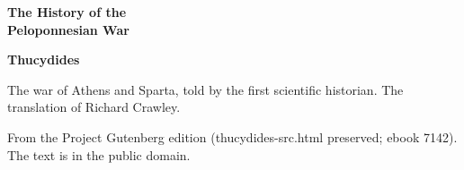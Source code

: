 \documentclass[11pt,letterpaper]{article}
\begin{document}
\color{ink}

\begin{titlepage}
\centering
\vspace*{4em}
{\LARGE\bfseries\color{heading} The History of the\\[0.3em]Peloponnesian War\par}
\vspace{2em}
{\Large\bfseries\color{heading} Thucydides\par}
\vspace{2.5em}
{\itshape\color{subhead}\parbox{0.8\linewidth}{\centering The war of Athens and Sparta, told by the first scientific historian. The translation of Richard Crawley.\par}}
\vfill
{\small From the Project Gutenberg edition (thucydides-src.html preserved; ebook 7142). The text is in the public domain.\par}
\vspace{2em}
\end{titlepage}

\tableofcontents


\end{document}
